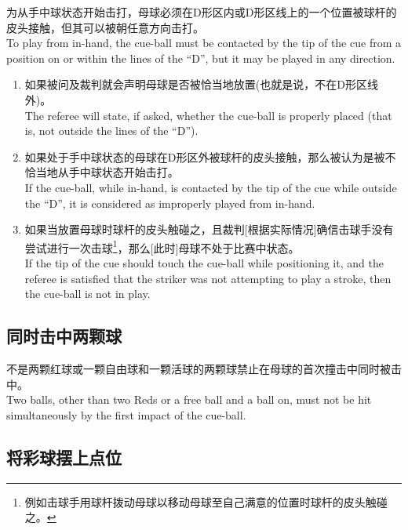 \noindent 为从手中球状态开始击打，母球必须在D形区内或D形区线上的一个位置被球杆的皮头接触，但其可以被朝任意方向击打。\\
To play from in-hand, the cue-ball must be contacted by the tip of the cue from a position on or within the lines of the ``D'', but it may be played in any direction.
\begin{enumerate}[label=(\alph*)]
    \item 如果被问及裁判就会声明母球是否被恰当地放置(也就是说，不在D形区线外)。\\
    The referee will state, if asked, whether the cue-ball is properly placed (that is, not outside the lines of the ``D'').
    \item 如果处于手中球状态的母球在D形区外被球杆的皮头接触，那么被认为是被不恰当地从手中球状态开始击打。\\
    If the cue-ball, while in-hand, is contacted by the tip of the cue while outside the ``D'', it is considered as improperly played from in-hand.
    \item 如果当放置母球时球杆的皮头触碰之，且裁判[根据实际情况]确信击球手没有尝试进行一次击球\footnote{例如击球手用球杆拨动母球以移动母球至自己满意的位置时球杆的皮头触碰之。}，那么[此时]母球不处于比赛中状态。\\
    If the tip of the cue should touch the cue-ball while positioning it, and the referee is satisfied that the striker was not attempting to play a stroke, then the cue-ball is not in play.
\end{enumerate}

\subsection{同时击中两颗球}

\noindent 不是两颗红球或一颗自由球和一颗活球的两颗球禁止在母球的首次撞击中同时被击中。\\
Two balls, other than two Reds or a free ball and a ball on, must not be hit simultaneously by the first impact of the cue-ball.

\subsection{将彩球摆上点位}\label{2237}

